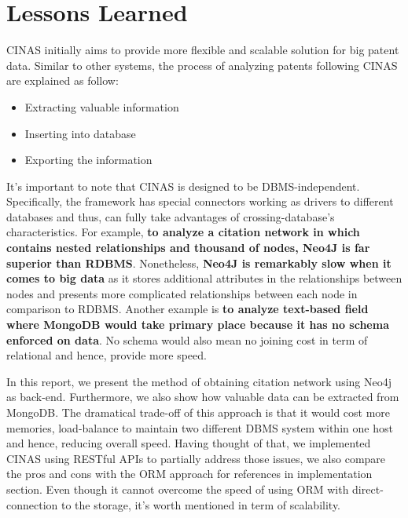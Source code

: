 \documentclass{article}
\begin{document}
\section{Lessons Learned}
CINAS initially aims to provide more flexible and scalable solution for big patent data. Similar to other systems, the process of analyzing patents following CINAS are explained as follow:

\begin{itemize}
\item Extracting valuable information
\item Inserting into database
\item Exporting the information
\end{itemize}

It's important to note that CINAS is designed to be DBMS-independent. Specifically, the framework has special connectors working as drivers to different databases and thus, can fully take advantages of crossing-database's characteristics. For example, \textbf{to analyze a citation network in which contains nested relationships and thousand of nodes,  Neo4J is far superior than RDBMS}. Nonetheless, \textbf{Neo4J is remarkably slow when it comes to big data} as it stores additional attributes in the relationships between nodes and presents more complicated relationships between each node in comparison to RDBMS. Another example is \textbf{to analyze text-based field where MongoDB would take primary place because it has no schema enforced on data}. No schema would also mean no joining cost in term of relational and hence, provide more speed. 

In this report, we present the method of obtaining citation network using Neo4j as back-end. Furthermore, we also show how valuable data can be extracted from MongoDB. The dramatical trade-off of this approach is that it would cost more memories, load-balance to maintain two different DBMS system within one host and hence, reducing overall speed. Having thought of that, we implemented CINAS using RESTful APIs to partially address those issues, we also compare the pros and cons with the ORM approach for references in implementation section. Even though it cannot overcome the speed of using ORM with direct-connection to the storage, it's worth mentioned in term of scalability.
\end{document}
